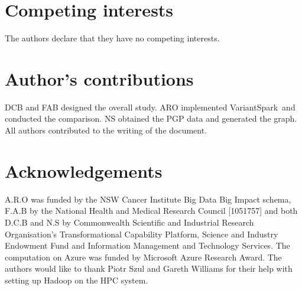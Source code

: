 \documentclass{bmcart}
\newcommand{\variantSpark}{{\sc VariantSpark}}
\begin{document}

\begin{backmatter}

\section*{Competing interests}
  The authors declare that they have no competing interests.

\section*{Author's contributions}
    DCB and FAB designed the overall study. ARO implemented \variantSpark\ and conducted the comparison. NS obtained the PGP data and generated the graph.
    All authors contributed to the writing of the document. 

\section*{Acknowledgements}
  A.R.O was funded by the NSW Cancer Institute Big Data Big Impact schema, F.A.B by the National Health and Medical Research Council [1051757] and both D.C.B and N.S by Commonwealth Scientific and Industrial Research Organisation's Transformational Capability Platform, Science and Industry Endowment Fund and Information Management and Technology Services. The computation on Azure was funded by Microsoft Azure Research Award. 
The authors would like to thank Piotr Szul and Gareth Williams for their help with setting up Hadoop on the HPC system.



\end{backmatter}
\end{document}
